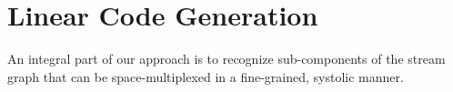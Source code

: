 \section{Linear Code Generation}
\label{sec:linear}

An integral part of our approach is to recognize sub-components of the
stream graph that can be space-multiplexed in a fine-grained, systolic
manner.  
